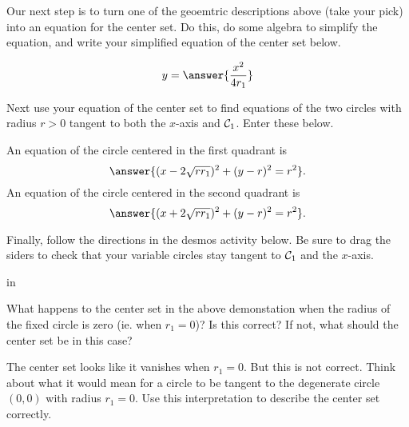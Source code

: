 \documentclass{ximera}
\newcommand{\pskip}{\vskip 0.1 in}
\begin{document}
\begin{exploration}

Our next step is to turn one of the geoemtric descriptions above (take your pick) into an equation for the center set. Do this, do some algebra to simplify the equation, and write your simplified equation of the center set below.
\begin{question} \label{Q341:Spheres}
\[
    y = \answer{\frac{x^2}{4r_1}}
\]
\end{question}


Next use your equation of the center set to find equations of the two circles with radius $r>0$  tangent to both the $x$-axis and ${\cal C}_1$. Enter these below.

\begin{question} \label{Q4541:Spheres}
An equation of the circle centered in the first quadrant is
\[
     \answer{(x-2\sqrt{rr_1})^2 + (y-r)^2 = r^2} .
\]
An equation of the circle centered in the second quadrant is
\[
     \answer{(x+2\sqrt{rr_1})^2 + (y-r)^2 = r^2} .
\]
\end{question}

Finally, follow the directions in the desmos activity below. Be sure to drag the siders to check that your variable circles stay tangent to ${\cal C}_1$ and the $x$-axis.


 
\begin{onlineOnly}
    \begin{center}
\end{center}
\end{onlineOnly}

\pskip

\begin{question} \label{Q441:Spheres}
What happens to the center set in the above demonstation when the radius of the fixed circle is zero (ie. when $r_1=0$)? Is this correct? If not, what should the center set be in this case?
\begin{hint}
The center set looks like it vanishes when $r_1=0$. But this is not correct. Think about what it would mean for a circle to be tangent to the degenerate circle $(0,0)$ with radius $r_1=0$. Use this interpretation to describe the center set correctly.
\end{hint}

\end{question}
\end{exploration}
\end{document}
